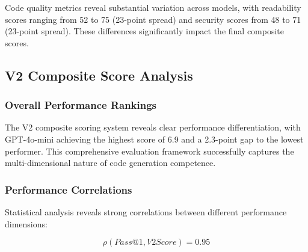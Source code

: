 \documentclass[conference]{IEEEtran}
\begin{document}
Code quality metrics reveal substantial variation across models, with readability scores ranging from 52 to 75 (23-point spread) and security scores from 48 to 71 (23-point spread). These differences significantly impact the final composite scores.

\subsection{V2 Composite Score Analysis}

\subsubsection{Overall Performance Rankings}

\begin{table}[ht]
\centering
\small
\caption{V2 Composite Score Rankings and Performance Gaps}
\label{tab:v2_scores}
\end{table}

The V2 composite scoring system reveals clear performance differentiation, with GPT-4o-mini achieving the highest score of 6.9 and a 2.3-point gap to the lowest performer. This comprehensive evaluation framework successfully captures the multi-dimensional nature of code generation competence.

\subsubsection{Performance Correlations}

Statistical analysis reveals strong correlations between different performance dimensions:

\begin{equation}
    \mathit{\rho}(\mathit{Pass@1}, \mathit{V2Score}) = 0.95
\end{equation}
\end{document}
